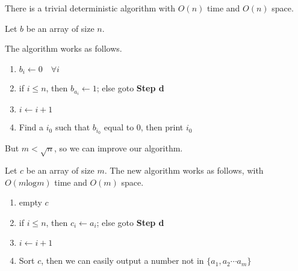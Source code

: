 
			There is a trivial deterministic algorithm with $O(n)$ time and $O(n)$ space.
			
			Let $b$ be an array of size $n$.
		
			The algorithm works as follows.
			\begin{enumerate}
				\item
					$b_i \leftarrow 0 \quad \forall i$
				\item
					if $i \leq n$, then $b_{a_i} \leftarrow 1$;
					else goto \textbf{Step d}
				\item
					$i \leftarrow i + 1$
				\item
					Find a $i_0$ such that $b_{i_0}$ equal to $0$, then print $i_0$
			\end{enumerate}
			
			But $m < \sqrt{n}$, so we can improve our algorithm.
			
			Let $c$ be an array of size $m$.
			The new algorithm works as follows, with $O(m\text{log}m)$ time and $O(m)$ space.
			\begin{enumerate}
				\item
					empty $c$
				\item
					if $i \leq n$, then $c_i \leftarrow a_i$;
					else goto \textbf{Step d}
				\item
					$i \leftarrow i + 1$
				\item
					Sort $c$, then we can easily output a number not in $\{a_1, a_2 \cdots a_m\}$
			\end{enumerate}
